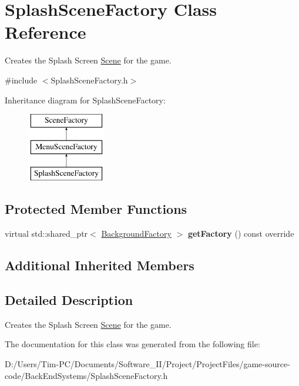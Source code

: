 \hypertarget{class_splash_scene_factory}{}\section{Splash\+Scene\+Factory Class Reference}
\label{class_splash_scene_factory}


Creates the Splash Screen \hyperlink{class_scene}{Scene} for the game.  




{\ttfamily \#include $<$Splash\+Scene\+Factory.\+h$>$}

Inheritance diagram for Splash\+Scene\+Factory\+:\begin{figure}[H]
\begin{center}
\leavevmode
\includegraphics[height=3.000000cm]{d4/ded/class_splash_scene_factory}
\end{center}
\end{figure}
\subsection*{Protected Member Functions}
\begin{DoxyCompactItemize}
\item 
\mbox{\label{class_splash_scene_factory_a08e3da2eb18122670b40c3520462db51}} 
virtual std\+::shared\+\_\+ptr$<$ \hyperlink{class_background_factory}{Background\+Factory} $>$ {\bfseries get\+Factory} () const override
\end{DoxyCompactItemize}
\subsection*{Additional Inherited Members}


\subsection{Detailed Description}
Creates the Splash Screen \hyperlink{class_scene}{Scene} for the game. 

The documentation for this class was generated from the following file\+:\begin{DoxyCompactItemize}
\item 
D\+:/\+Users/\+Tim-\/\+P\+C/\+Documents/\+Software\+\_\+\+I\+I/\+Project/\+Project\+Files/game-\/source-\/code/\+Back\+End\+Systems/Splash\+Scene\+Factory.\+h\end{DoxyCompactItemize}
